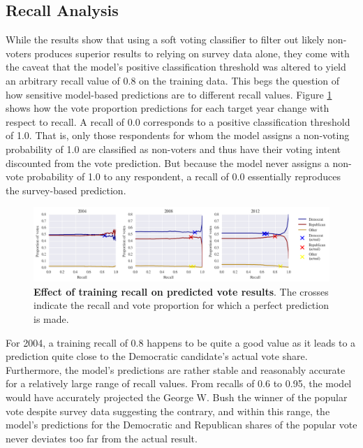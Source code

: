 \documentclass{article}
\begin{document}
	\subsection{Recall Analysis}
	While the results show that using a soft voting classifier to filter out likely non-voters produces superior results to relying on survey data alone, they come with the caveat that the model's positive classification threshold was altered to yield an arbitrary recall value of 0.8 on the training data. This begs the question of how sensitive model-based predictions are to different recall values. Figure \ref{fig:recall} shows how the vote proportion predictions for each target year change with respect to recall. A recall of 0.0 corresponds to a positive classification threshold of 1.0. That is, only those respondents for whom the model assigns a non-voting probability of 1.0 are classified as non-voters and thus have their voting intent discounted from the vote prediction. But because the model never assigns a non-vote probability of 1.0 to any respondent, a recall of 0.0 essentially reproduces the survey-based prediction. 
	\begin{figure}[h!]
		\begin{center}
			\includegraphics*[width=1\linewidth]{recall}
			\caption{\textbf{Effect of training recall on predicted vote results}. The crosses indicate the recall and vote proportion for which a perfect prediction is made.}
			\label{fig:recall}
		\end{center}
	\end{figure}
	For 2004, a training recall of 0.8 happens to be quite a good value as it leads to a prediction quite close to the Democratic candidate's actual vote share. Furthermore, the model's predictions are rather stable and reasonably accurate for a relatively large range of recall values. From recalls of 0.6 to 0.95, the model would have accurately projected the George W. Bush the winner of the popular vote despite survey data suggesting the contrary, and within this range, the model's predictions for the Democratic and Republican shares of the popular vote never deviates too far from the actual result.
	\\\\
\end{document}
